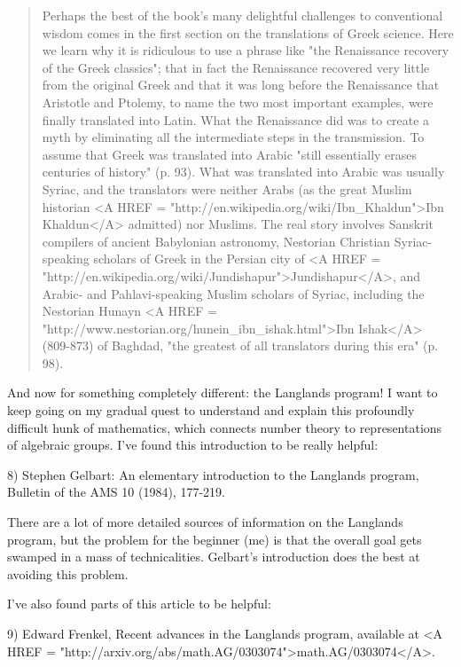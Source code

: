 \begin{quote}
    Perhaps the best of the book's many delightful challenges 
    to conventional wisdom comes in the first section on the 
    translations of Greek science.  Here we learn why it is 
    ridiculous to use a phrase like "the Renaissance recovery 
    of the Greek classics"; that in fact the Renaissance recovered 
    very little from the original Greek and that it was long before 
    the Renaissance that Aristotle and Ptolemy, to name the two most 
    important examples, were finally translated into Latin.  What 
    the Renaissance did was to create a myth by eliminating all the 
    intermediate steps in the transmission.  To assume that Greek 
    was translated into Arabic "still essentially erases centuries 
    of history" (p. 93).  What was translated into Arabic was 
    usually Syriac, and the translators were neither Arabs (as 
    the great Muslim historian <A HREF = "http://en.wikipedia.org/wiki/Ibn_Khaldun">Ibn Khaldun</A> admitted) nor Muslims. 
    The real story involves Sanskrit compilers of ancient Babylonian 
    astronomy, Nestorian Christian Syriac-speaking scholars of 
    Greek in the Persian city of <A HREF = "http://en.wikipedia.org/wiki/Jundishapur">Jundishapur</A>, and Arabic- and 
    Pahlavi-speaking Muslim scholars of Syriac, including the 
    Nestorian Hunayn <A HREF = "http://www.nestorian.org/hunein_ibn_ishak.html">Ibn Ishak</A> (809-873) of Baghdad, "the greatest 
    of all translators during this era" (p. 98).
\end{quote}

And now for something completely different: the Langlands program!
I want to keep going on my gradual quest to understand and explain 
this profoundly difficult hunk of mathematics, which connects 
number theory to representations of algebraic groups.  I've found 
this introduction to be really helpful:

8) Stephen Gelbart: An elementary introduction to the Langlands 
program, Bulletin of the AMS 10 (1984), 177-219.

There are a lot of more detailed sources of information on the
Langlands program, but the problem for the beginner (me) is that
the overall goal gets swamped in a mass of technicalities.  
Gelbart's introduction does the best at avoiding this problem.

I've also found parts of this article to be helpful:

9) Edward Frenkel, Recent advances in the Langlands program, available
at <A HREF = "http://arxiv.org/abs/math.AG/0303074">math.AG/0303074</A>.

